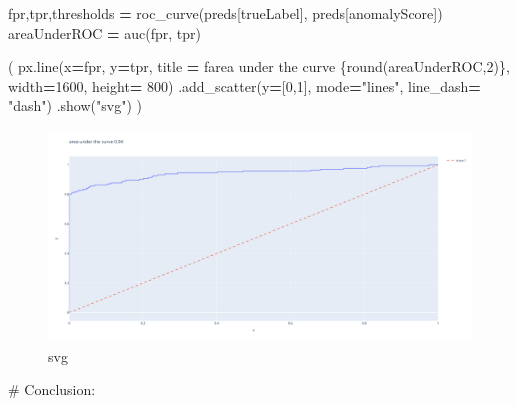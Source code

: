 \documentclass[
]{article}
\newenvironment{Shaded}{\begin{snugshade}}{\end{snugshade}}
\newcommand{\BuiltInTok}[1]{#1}
\newcommand{\DecValTok}[1]{\textcolor[rgb]{0.00,0.00,0.81}{#1}}
\newcommand{\NormalTok}[1]{#1}
\newcommand{\OperatorTok}[1]{\textcolor[rgb]{0.81,0.36,0.00}{\textbf{#1}}}
\newcommand{\SpecialCharTok}[1]{\textcolor[rgb]{0.00,0.00,0.00}{#1}}
\newcommand{\SpecialStringTok}[1]{\textcolor[rgb]{0.31,0.60,0.02}{#1}}
\newcommand{\StringTok}[1]{\textcolor[rgb]{0.31,0.60,0.02}{#1}}
\begin{document}
\begin{Shaded}
\begin{Highlighting}[]
\NormalTok{fpr,tpr,thresholds }\OperatorTok{=}\NormalTok{ roc\_curve(preds[}\StringTok{\textquotesingle{}trueLabel\textquotesingle{}}\NormalTok{], preds[}\StringTok{\textquotesingle{}anomalyScore\textquotesingle{}}\NormalTok{])}
\NormalTok{areaUnderROC }\OperatorTok{=}\NormalTok{ auc(fpr, tpr)}
\end{Highlighting}
\end{Shaded}

\begin{Shaded}
\begin{Highlighting}[]
\NormalTok{(}
\NormalTok{    px.line(x}\OperatorTok{=}\NormalTok{fpr, y}\OperatorTok{=}\NormalTok{tpr, title }\OperatorTok{=} \SpecialStringTok{f\textquotesingle{}area under the curve }\SpecialCharTok{\{}\BuiltInTok{round}\NormalTok{(areaUnderROC,}\DecValTok{2}\NormalTok{)}\SpecialCharTok{\}}\SpecialStringTok{\textquotesingle{}}\NormalTok{, width}\OperatorTok{=}\DecValTok{1600}\NormalTok{, height}\OperatorTok{=} \DecValTok{800}\NormalTok{)}
\NormalTok{    .add\_scatter(y}\OperatorTok{=}\NormalTok{[}\DecValTok{0}\NormalTok{,}\DecValTok{1}\NormalTok{], mode}\OperatorTok{=}\StringTok{"lines"}\NormalTok{, line\_dash}\OperatorTok{=} \StringTok{"dash"}\NormalTok{)    }
\NormalTok{    .show(}\StringTok{"svg"}\NormalTok{)}
\NormalTok{)}
\end{Highlighting}
\end{Shaded}

\begin{figure}
\centering
\includegraphics{mymarkdownfile_files/mymarkdownfile_51_0.svg}
\caption{svg}
\end{figure}

\# Conclusion:
\end{document}
